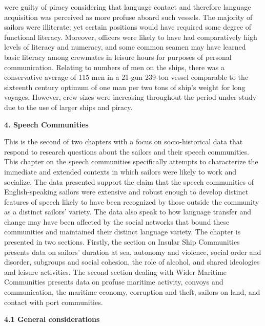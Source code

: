 \begin{styleStandard}
were guilty of piracy considering that language contact and therefore language acquisition was perceived as more profuse aboard such vessels. The majority of sailors were illiterate; yet certain positions would have required some degree of functional literacy. Moreover, officers were likely to have had comparatively high levels of literacy and numeracy, and some common seamen may have learned basic literacy among crewmates in leisure hours for purposes of personal communication. Relating to numbers of men on the ships, there was a conservative average of 115 men in a 21-gun 239-ton vessel comparable to the sixteenth century optimum of one man per two tons of ship’s weight for long voyages. However, crew sizes were increasing throughout the period under study due to the use of larger ships and piracy. 
\end{styleStandard}


\clearpage\begin{styleStandard}
\textbf{4. Speech Communities}
\end{styleStandard}


\begin{styleStandard}
This is the second of two chapters with a focus on socio-historical data that respond to research questions about the sailors and their speech communities. This chapter on the speech communities specifically attempts to characterize the immediate and extended contexts in which sailors were likely to work and socialize. The data presented support the claim that the speech communities of English-speaking sailors were extensive and robust enough to develop distinct features of speech likely to have been recognized by those outside the community as a distinct sailors’ variety. The data also speak to how language transfer and change may have been affected by the social networks that bound these communities and maintained their distinct language variety. The chapter is presented in two sections. Firstly, the section on Insular Ship Communities presents data on sailors’ duration at sea, autonomy and violence, social order and disorder, subgroups and social cohesion, the role of alcohol, and shared ideologies and leisure activities. The second section dealing with Wider Maritime Communities presents data on profuse maritime activity, convoys and communication, the maritime economy, corruption and theft, sailors on land, and contact with port communities. 
\end{styleStandard}


\begin{styleStandard}
\textbf{4.1 General considerations}
\end{styleStandard}


